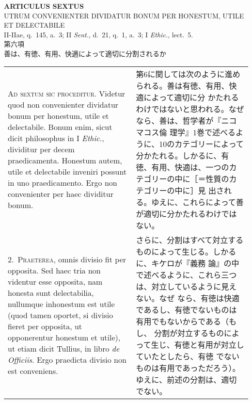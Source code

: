 \documentclass[10pt]{jsarticle} %
\begin{document}
\newpage
{}

\begin{center}
 {\Large {\bf ARTICULUS SEXTUS}}\\
 {\large UTRUM CONVENIENTER DIVIDATUR BONUM PER HONESTUM, UTILE ET DELECTABILE}\\
 {\footnotesize II-IIae, q.~145, a.~3; II {\itshape Sent.}, d.~21, q.~1,
 a.~3; I {\itshape Ethic.}, lect.~5.}\\
 {\Large 第六項\\善は、有徳、有用、快適によって適切に分割されるか}
\end{center}

\begin{longtable}{p{21em}p{21em}}


{\huge A}{\scshape d sextum sic proceditur}. Videtur quod non
 convenienter dividatur bonum per honestum, utile et delectabile. Bonum
 enim, sicut dicit philosophus in I {\itshape Ethic}., dividitur per decem
 praedicamenta. Honestum autem, utile et delectabile inveniri possunt in
 uno praedicamento. Ergo non convenienter per haec dividitur bonum.

&


第6に関しては次のように進められる。善は有徳、有用、快適によって適切に分
 かたれるわけではないと思われる。なぜなら、善は、哲学者が『ニコマコス倫
 理学』1巻で述べるように、10のカテゴリーによって分かたれる。しかるに、有
 徳、有用、快適は、一つのカテゴリーの中に［＝性質のカテゴリーの中に］見
 出される。ゆえに、これらによって善が適切に分かたれるわけではない。

\\


2.~{\scshape Praeterea}, omnis divisio fit per opposita. Sed haec tria non
 videntur esse opposita, nam honesta sunt delectabilia, nullumque
 inhonestum est utile (quod tamen oportet, si divisio fieret per
 opposita, ut opponerentur honestum et utile), ut etiam dicit Tullius,
 in libro {\itshape de Officiis}. Ergo praedicta divisio non est conveniens.

&


さらに、分割はすべて対立するものによって生じる。しかるに、キケロが『義務
 論』の中で述べるように、これら三つは、対立しているように見えない。なぜ
 なら、有徳は快適であるし、有徳でないものは有用でもないからである（もし、
 分割が対立するものによって生じ、有徳と有用が対立していたとしたら、有徳
 でないものは有用であっただろう）。ゆえに、前述の分割は、適切でない。

\\



\end{longtable}
\end{document}
